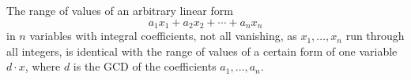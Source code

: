 The range of values of an arbitrary linear form
$$a_1 x_1 + a_2 x_2 + \cdots + a_n x_n$$
in $n$ variables with integral coefficients, not all vanishing, as $x_1,\ldots,x_n$ run through all integers, is identical with the range of values of a certain form of one variable $d \cdot x$, where $d$ is the GCD of the coefficients $a_1,\ldots,a_n$.
